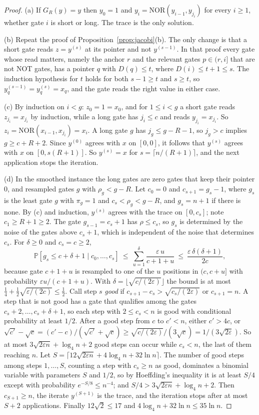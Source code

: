\documentclass[11pt]{amsart}
\theoremstyle{definition}
\theoremstyle{remark}
\newcommand{\eps}{\varepsilon}
\newcommand{\NOR}{\mathrm{NOR}}
\newcommand{\PP}{\mathbb{P}}
\begin{document}
\begin{proof}
(a) If $G_R(y)=y$ then $y_0=1$ and $y_i=\NOR(y_{i-1},y_{j_i})$ for every $i\ge1$, whether gate $i$
is short or long. The trace is the only solution.

(b) Repeat the proof of Proposition~\ref{prop:jacobi}(b). The only change is that a short gate
reads $z=y^{(s)}$ at its pointer and not $y^{(s-1)}$. In that proof every gate whose read matters,
namely the anchor $r$ and the relevant gates $p\in(r,i]$ that are not NOT gates, has a pointer $q$
with $D(q)\le t$, where $D(i)\le t+1\le s$. The induction hypothesis for $t$ holds for both
$s-1\ge t$ and $s\ge t$, so $y^{(s-1)}_q=y^{(s)}_q=x_q$, and the gate reads the right value in
either case.

(c) By induction on $i<g$: $z_0=1=x_0$, and for $1\le i<g$ a short gate reads $z_{j_i}=x_{j_i}$ by
induction, while a long gate has $j_i\le c$ and reads $y_{j_i}=x_{j_i}$. So
$z_i=\NOR(x_{i-1},x_{j_i})=x_i$. A long gate $g$ has $j_g\le g-R-1$, so $j_g>c$ implies
$g\ge c+R+2$. Since $y^{(0)}$ agrees with $x$ on $[0,0]$, it follows that $y^{(s)}$ agrees with $x$
on $[0,s(R+1)]$. So $y^{(s)}=x$ for $s=\lceil n/(R+1)\rceil$, and the next application stops the
iteration.

(d) In the smoothed instance the long gates are zero gates that keep their pointer $0$, and
resampled gates $g$ with $\rho_g<g-R$. Let $c_0=0$ and $c_{s+1}=g_s-1$, where $g_s$ is the least
gate $g$ with $\pi_g=1$ and $c_s<\rho_g<g-R$, and $g_s=n+1$ if there is none. By (c) and
induction, $y^{(s)}$ agrees with the trace on $[0,c_s]$; note $c_1\ge R+1\ge2$. The gate
$g_{s-1}=c_s+1$ has $\rho\le c_s$, so $g_s$ is determined by the noise of the gates above
$c_s+1$, which is independent of the noise that determines $c_s$. For $\delta\ge0$ and $c_s=c\ge2$,
\[
\PP[g_s\le c+\delta+1\mid c_0,\dots,c_s]\ \le\ \sum_{u=1}^{\delta}\frac{\eps\,u}{c+1+u}
\ \le\ \frac{\eps\,\delta(\delta+1)}{2c},
\]
because gate $c+1+u$ is resampled to one of the $u$ positions in $(c,c+u]$ with probability
$\eps u/(c+1+u)$. With $\delta=\lfloor\sqrt{c/(2\eps)}\rfloor$ the bound is at most
$\frac14+\frac12\sqrt{\eps/(2c)}\le\frac12$. Call step $s$ \emph{good} if
$c_{s+1}-c_s>\sqrt{c_s/(2\eps)}$ or $c_{s+1}=n$. A step that is not good has a gate that qualifies
among the gates $c_s+2,\dots,c_s+\delta+1$, so each step with $2\le c_s<n$ is good with
conditional probability at least $1/2$. After a good step from $c$ to $c'<n$, either $c'>4c$, or
$\sqrt{c'}-\sqrt c=(c'-c)/(\sqrt{c'}+\sqrt c)\ge\sqrt{c/(2\eps)}/(3\sqrt c)=1/(3\sqrt{2\eps})$. So
at most $3\sqrt{2\eps n}+\log_4n+2$ good steps can occur while $c_s<n$, the last of them reaching
$n$. Let $S=\lceil12\sqrt{2\eps n}+4\log_4n+32\ln n\rceil$. The number of good steps among steps
$1,\dots,S$, counting a step with $c_s\ge n$ as good, dominates a binomial variable with
parameters $S$ and $1/2$, so by Hoeffding's inequality it is at least $S/4$ except with
probability $e^{-S/8}\le n^{-4}$; and $S/4>3\sqrt{2\eps n}+\log_4n+2$. Then $c_{S+1}\ge n$, the
iterate $y^{(S+1)}$ is the trace, and the iteration stops after at most $S+2$ applications. Finally
$12\sqrt2\le17$ and $4\log_4n+32\ln n\le35\ln n$.
\end{proof}
\end{document}
